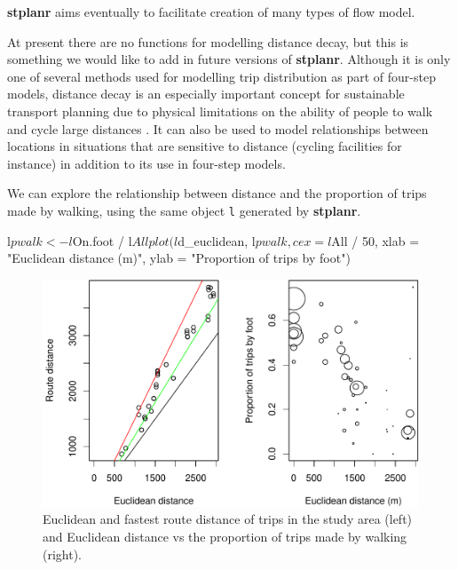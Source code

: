 \textbf{stplanr}
aims eventually to facilitate creation of many types of flow model.

At present there are no functions for modelling distance decay, but this
is something we would like to add in future versions of
\textbf{stplanr}.
Although it is only one of several methods used for modelling trip distribution as part of four-step models,
distance decay is an especially important concept for
sustainable transport planning due to physical limitations on the
ability of people to walk and cycle large distances
\citep{iacono_measuring_2010}.
It can also be used to model relationships between locations in situations that are sensitive to distance (cycling facilities for instance) in addition to its use in four-step models.

We can explore the relationship between distance and the proportion of
trips made by walking, using the same object \texttt{l} generated by
\textbf{stplanr}.

\begin{Schunk}
\begin{Sinput}
l$pwalk <- l$On.foot / l$All
plot(l$d_euclidean, l$pwalk, cex = l$All / 50,
  xlab = "Euclidean distance (m)", ylab = "Proportion of trips by foot")
\end{Sinput}
\end{Schunk}

\begin{Schunk}
\begin{figure}
\includegraphics[width=1\linewidth]{euclidfastest-1} \caption[Euclidean and fastest route distance of trips in the study area (left) and Euclidean distance vs the proportion of trips made by walking (right)]{Euclidean and fastest route distance of trips in the study area (left) and Euclidean distance vs the proportion of trips made by walking (right).}\label{fig:euclidfastest}
\end{figure}
\end{Schunk}

